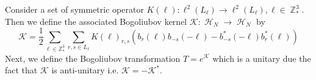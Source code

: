 \documentclass[sn-mathphys,Numbered, a4paper ,nocrop]{sn-jnl}%
\DeclareMathOperator{\Z}{\mathbb{Z}}
\DeclareMathOperator{\HH}{\mathcal{H}}
\newcommand{\half}{\frac{1}{2}}
\theoremstyle{plain}
\newtheorem{lemma}[theorem]{Lemma}
\theoremstyle{definition}
\theoremstyle{remark}
\theoremstyle{plain}
\theoremstyle{definition}
\theoremstyle{remark}
\begin{document}
Consider a set of symmetric operator $K(\ell):\ell^2(L_\ell)\rightarrow \ell^2(L_\ell), \ell \in \Z^3_*$. Then we define the associated Bogoliubov kernel $\mathcal{K}:\HH_N\rightarrow\HH_N $ by
\begin{equation}
\mathcal{K} = \frac{1}{2}\sum\limits_{\ell\in \mathbb{Z}^3_*}\sum\limits_{r,s\in L_\ell}K(\ell)_{r,s}\left(b_r(\ell)b_{-s}(-\ell)-b^*_{-s}(-\ell)b^*_{r}(\ell)\right)
\end{equation}
Next, we define the Bogoliubov transformation $T = e^{\mathcal{K}} $ which is a unitary due the fact that $\mathcal{K}$ is anti-unitary i.e. $\mathcal{K}=-\mathcal{K}^* $.\newline
\end{document}
